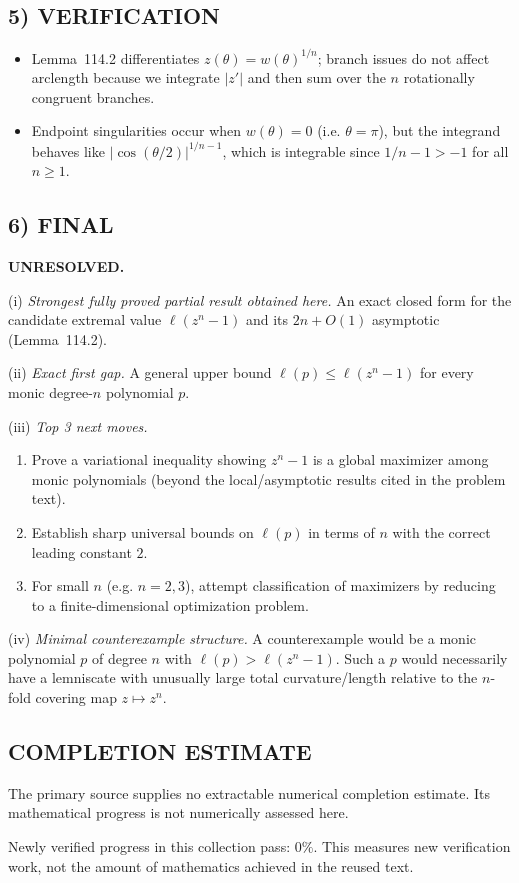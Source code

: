 \subsection*{5) VERIFICATION}
\begin{itemize}
\item Lemma~114.2 differentiates $z(\theta)=w(\theta)^{1/n}$; branch issues do not affect arclength because we integrate $|z'|$ and then sum over the $n$ rotationally congruent branches.
\item Endpoint singularities occur when $w(\theta)=0$ (i.e. $\theta=\pi$), but the integrand behaves like $|\cos(\theta/2)|^{1/n-1}$, which is integrable since $1/n-1>-1$ for all $n\ge1$.
\end{itemize}

\subsection*{6) FINAL}
\textbf{UNRESOLVED.}

(i) \emph{Strongest fully proved partial result obtained here.}
An exact closed form for the candidate extremal value $\ell(z^n-1)$ and its $2n+O(1)$ asymptotic (Lemma~114.2).

(ii) \emph{Exact first gap.}
A general upper bound $\ell(p)\le \ell(z^n-1)$ for every monic degree-$n$ polynomial $p$.

(iii) \emph{Top 3 next moves.}
\begin{enumerate}
\item Prove a variational inequality showing $z^n-1$ is a global maximizer among monic polynomials (beyond the local/asymptotic results cited in the problem text).
\item Establish sharp universal bounds on $\ell(p)$ in terms of $n$ with the correct leading constant $2$.
\item For small $n$ (e.g. $n=2,3$), attempt classification of maximizers by reducing to a finite-dimensional optimization problem.
\end{enumerate}

(iv) \emph{Minimal counterexample structure.}
A counterexample would be a monic polynomial $p$ of degree $n$ with $\ell(p)>\ell(z^n-1)$.  Such a $p$ would necessarily have a lemniscate with unusually large total curvature/length relative to the $n$-fold covering map $z\mapsto z^n$.




\subsection*{COMPLETION ESTIMATE}
The primary source supplies no extractable numerical completion estimate. Its mathematical progress is not numerically assessed here.

Newly verified progress in this collection pass: $0\%$. This measures new verification work, not the amount of mathematics achieved in the reused text.
